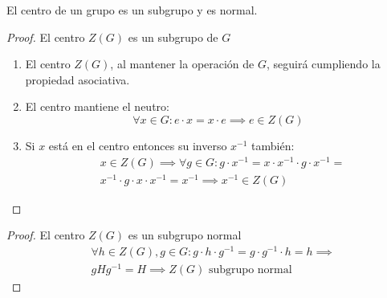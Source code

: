 \begin{thm}
    El centro de un grupo es un subgrupo y es normal.
\end{thm}

\begin{proof}
    El centro $Z(G)$ es un subgrupo de $G$
    \begin{enumerate}
        \item El centro $Z(G)$, al mantener la operación de $G$, seguirá cumpliendo la propiedad asociativa.
        \item El centro mantiene el neutro:
        \begin{equation}
            \forall x \in G: e \cdot x = x \cdot e \implies e \in Z(G)
        \end{equation}
    \item Si $x$ está en el centro entonces su inverso $x^{-1}$ también:
        \begin{equation}
            \begin{split}
            & x \in Z(G) \implies \forall g \in G : g \cdot x^{-1} = x\cdot x^{-1}\cdot g\cdot x^{-1} =\\
            & x^{-1} \cdot g \cdot x \cdot x^{-1} = x^{-1} \implies x^{-1} \in Z(G) 
            \end{split}
        \end{equation}
    \end{enumerate}
\end{proof}

\begin{proof}
    El centro $Z(G)$ es un subgrupo normal
    \begin{equation}
        \begin{split}
            & \forall h \in Z(G), g \in G: g \cdot h \cdot g^{-1}  = g \cdot g^{-1} \cdot h = h \implies\\
            & g H g^{-1} = H \implies Z(G) \text{ subgrupo normal}  
        \end{split}
    \end{equation}
\end{proof}
